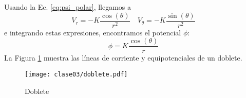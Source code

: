 Usando la Ec. \eqref{eq:psi_polar}, llegamos a
%
\begin{equation}
V_r = -K\frac{\cos(\theta)}{r^2}\quad V_\theta = -K\frac{\sin(\theta)}{r^2}
\end{equation}
%
e integrando estas expresiones, encontramos el potencial $\phi$:
%
\begin{equation}
\phi=K\frac{\cos(\theta)}{r}
\end{equation}
%
La Figura \ref{fig:doblete} muestra las líneas de corriente y equipotenciales de un doblete.
%
\begin{figure}[h!]
\centering
\texttt{[image: clase03/doblete.pdf]}
\caption{Doblete}
\label{fig:doblete}
\end{figure}
